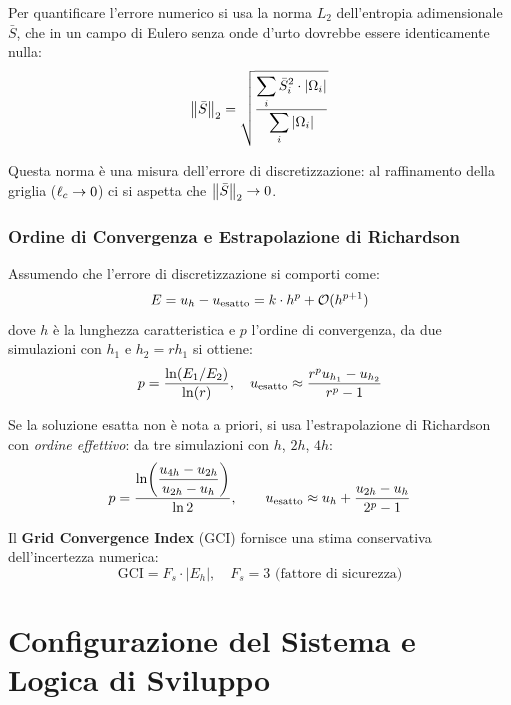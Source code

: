 Per quantificare l'errore numerico si usa la norma $L_2$ dell'entropia adimensionale $\bar{S}$,
che in un campo di Eulero senza onde d'urto dovrebbe essere identicamente nulla:
\begin{equation}
  \left\|\bar{S}\right\|_2 = \sqrt{\frac{\displaystyle\sum_i \bar{S}_i^2 \cdot |\Omega_i|}
                                  {\displaystyle\sum_i |\Omega_i|}}
  \label{eq:norma_entropia}
\end{equation}

Questa norma è una misura dell'errore di discretizzazione: al raffinamento della griglia
($\ell_c \to 0$) ci si aspetta che $\left\|\bar{S}\right\|_2 \to 0$.

\subsubsection{Ordine di Convergenza e Estrapolazione di Richardson}

Assumendo che l'errore di discretizzazione si comporti come:
\begin{equation}
  E = u_h - u_{\rm esatto} = k \cdot h^p + \mathcal{O}(h^{p+1})
\end{equation}
dove $h$ è la lunghezza caratteristica e $p$ l'ordine di convergenza, da due simulazioni con
$h_1$ e $h_2 = r h_1$ si ottiene:
\begin{equation}
  p = \frac{\ln(E_1/E_2)}{\ln(r)}, \quad
  u_{\rm esatto} \approx \frac{r^p u_{h_1} - u_{h_2}}{r^p - 1}
\end{equation}

Se la soluzione esatta non è nota a priori, si usa l'estrapolazione di Richardson con
\emph{ordine effettivo}: da tre simulazioni con $h$, $2h$, $4h$:
\begin{equation}
  p = \frac{\ln\!\left(\dfrac{u_{4h}-u_{2h}}{u_{2h}-u_h}\right)}{\ln 2}, \qquad
  u_{\rm esatto} \approx u_h + \frac{u_{2h}-u_h}{2^p - 1}
\end{equation}

Il \textbf{Grid Convergence Index} (GCI) fornisce una stima conservativa dell'incertezza
numerica:
\begin{equation}
  \text{GCI} = F_s \cdot |E_h|, \quad F_s = 3 \text{ (fattore di sicurezza)}
\end{equation}


\section{Configurazione del Sistema e Logica di Sviluppo}

